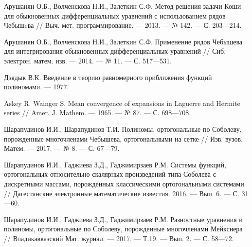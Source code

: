 \begin{thebibliography}{111}
Арушанян О.Б., Волченскова Н.И., Залеткин С.Ф. Метод решения задачи Коши для обыкновенных дифференциальных уравнений с использованием рядов Чебышeва // Выч. мет. программирование. --- 2013. --- № 142. --- С. 203---214.








Арушанян О.Б., Волченскова Н.И., Залеткин С.Ф. Применение рядов Чебышева для интегрирования обыкновенных дифференциальных уравнений // Сиб. электрон. матем. изв. --- 2014. --- № 11. --- С. 517---531.








Дзядык В.К. Введение в теорию равномерного приближения функций полиномами. --- 1977.








Askey R. Wainger S. Mean convergence of expansions in Laguerre and Hermite series // Amer. J. Mathem. --- 1965. --- № 87. --- С. 698---708.








Шарапудинов И.И., Шарапудинов Т.И. Полиномы, ортогональные по Соболеву, порожденные многочленами Чебышева, ортогональными на сетке // Изв. вузов. Матем. --- 2017. --- № 8. --- С. 67---79.









Шарапудинов И.И., Гаджиева З.Д., Гаджимирзаев Р.М. Системы функций, ортогональных относительно скалярных произведений типа Соболева с дискретными массами, порожденных классическими ортогональными системами // Дагестанские электронные математические известия. 2016. --- Вып. 6. --- С. 31---60.









Шарапудинов И.И., Гаджиева З.Д., Гаджимирзаев Р.М.
Разностные уравнения и полиномы, ортогональные по Соболеву, порожденные многочленами Мейкснера //
Владикавказский Мат. журнал. --- 2017. --- Т.19. --- Вып. 2. --- С. 58---72.










\end{thebibliography}
